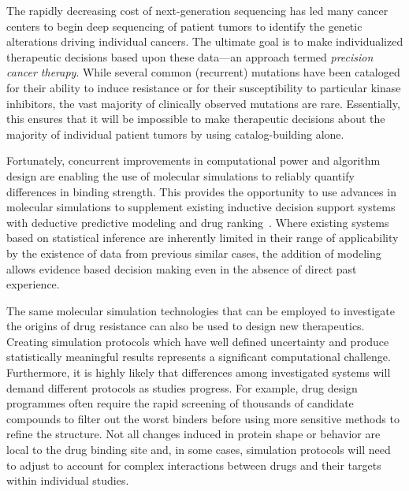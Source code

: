 The rapidly decreasing cost of next-generation sequencing has led many cancer
centers to begin deep sequencing of patient tumors to identify the genetic
alterations driving individual cancers. The ultimate goal is to make
individualized therapeutic decisions based upon these data---an approach
termed \textit{precision cancer therapy}. While several common (recurrent)
mutations have been cataloged for their ability to induce resistance or for
their susceptibility to particular kinase inhibitors, the vast majority of
clinically observed mutations are rare. Essentially, this ensures that it
will be impossible to make therapeutic decisions about the majority of
individual patient tumors by using catalog-building alone.

Fortunately, concurrent improvements in computational power and algorithm
design are enabling the use of molecular simulations to reliably quantify
differences in binding strength. This provides the opportunity to use advances
in molecular simulations to supplement existing inductive decision support
systems with deductive predictive modeling and drug ranking~\cite{Marias2011,
Sloot2009}. Where existing systems based on statistical inference are
inherently limited in their range of applicability by the existence of data
from previous similar cases, the addition of modeling allows evidence based
decision making even in the absence of direct past experience.


The same molecular simulation technologies that can be employed to
investigate the origins of drug resistance can also be used to design new
therapeutics. Creating simulation protocols which 
have well defined uncertainty and produce
statistically meaningful results represents a significant
computational challenge. Furthermore, it is highly likely that differences
among %
investigated systems %
will demand different protocols
as studies progress. For example, %
drug design programmes %
often require the rapid screening of thousands of candidate compounds to filter
out the worst binders before using more sensitive methods 
to refine the structure. Not all changes induced in protein shape or
behavior are local to the drug binding site and, in some cases, simulation
protocols will need to adjust to account for complex interactions between
drugs and their targets within individual studies.


